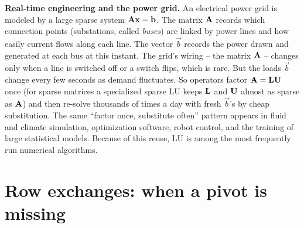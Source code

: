 \begin{applicationbox}
\textbf{Real-time engineering and the power grid.} An electrical power grid is modeled by a
large sparse system $\mathbf{A}\mathbf{x}=\mathbf{b}$. The matrix $\mathbf{A}$ records which connection
points (substations, called \emph{buses}) are linked by power lines and how easily current
flows along each line. The vector $\vec{b}$ records the power drawn and generated at each
bus at this instant. The grid's wiring -- the matrix $\mathbf{A}$ -- changes only when a
line is switched off or a switch flips, which is rare. But the loads $\vec{b}$ change every few
seconds as demand fluctuates. So operators factor $\mathbf{A}=\mathbf{L}\mathbf{U}$ once (for sparse
matrices a specialized sparse LU keeps $\mathbf{L}$ and $\mathbf{U}$ almost as sparse as $\mathbf{A}$)
and then re-solve thousands of times a day with fresh $\vec{b}$'s by cheap substitution.
The same ``factor once, substitute often'' pattern appears in fluid and climate simulation,
optimization software, robot control, and the training of large statistical models. Because
of this reuse, LU is among the most frequently run numerical algorithms.
\end{applicationbox}

\section{Row exchanges: when a pivot is missing}
\label{ch09:pivoting}

